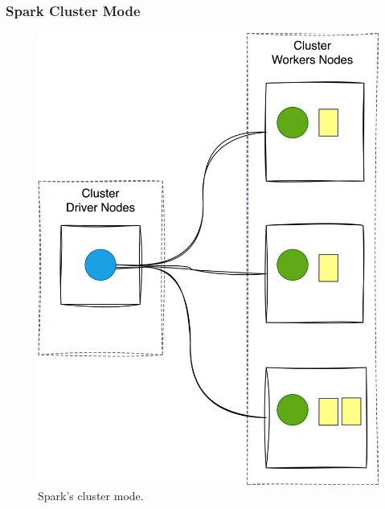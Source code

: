 %
\begin{frame}
    \frametitle{Spark Cluster Mode}
    \begin{figure}
        \includegraphics[width=\textwidth,height=.7\textheight,keepaspectratio]{./Figures/chapter-04/spark_cluster_mode}
        \caption{Spark’s cluster mode.}\label{fig:cluster_mode}
    \end{figure}
\end{frame}
